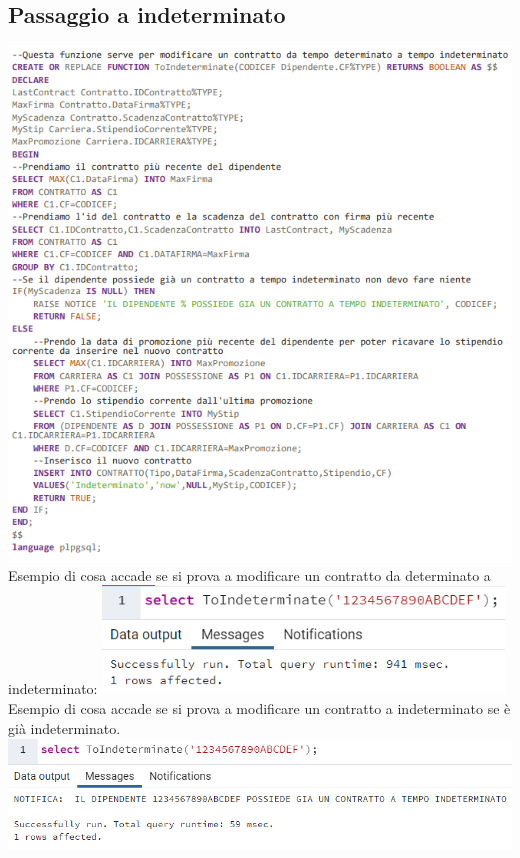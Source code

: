 \subsection{Passaggio a indeterminato}
\includegraphics[width=1.2\textwidth]{Immagini/function1.sql}
\newpage
Esempio di cosa accade se si prova a modificare un contratto da determinato a indeterminato:
\newline\newline
\includegraphics[width=0.8\textwidth]{Immagini/funzione1ok}
\newline\newline
Esempio di cosa accade se si prova a modificare un contratto a indeterminato se è già indeterminato.
\newline\newline
\includegraphics[width=1.1\textwidth]{Immagini/funzione1no}
